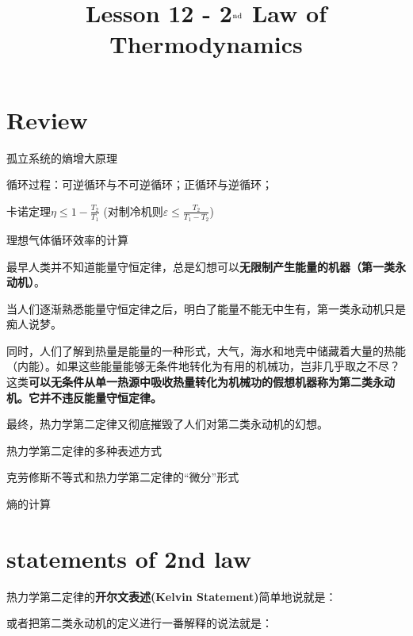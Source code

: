 \documentclass[CJK]{beamer}
\title{Lesson 12 - 2$^{\rm nd}$ Law of Thermodynamics}
\author{}
\date{}
\begin{document}

\section{Review}

\begin{frame}
\bch 
\bitem
\item{孤立系统的熵增大原理}
\item{循环过程：可逆循环与不可逆循环；正循环与逆循环；}
\item{卡诺定理$\eta \le 1 -\frac{T_2}{T_1}$ (对制冷机则$\varepsilon \le \frac{T_2}{T_1-T_2}$)}
\item{理想气体循环效率的计算}
\eitem
\ech
\end{frame}

\begin{frame}
\bch
\bitem
\item{最早人类并不知道能量守恒定律，总是幻想可以{\bf 无限制产生能量的机器（第一类永动机）}。}
\item{当人们逐渐熟悉能量守恒定律之后，明白了能量不能无中生有，第一类永动机只是痴人说梦。}
\item{同时，人们了解到热量是能量的一种形式，大气，海水和地壳中储藏着大量的热能（内能）。如果这些能量能够无条件地转化为有用的机械功，岂非几乎取之不尽？这类{\bf 可以无条件从单一热源中吸收热量转化为机械功的假想机器称为第二类永动机。它并不违反能量守恒定律。}}
\item{最终，热力学第二定律又彻底摧毁了人们对第二类永动机的幻想。}
\eitem
\ech
\end{frame}

\begin{frame}
\bch
\bitem
\item{热力学第二定律的多种表述方式}
\item{克劳修斯不等式和热力学第二定律的“微分”形式}
\item{熵的计算}
\eitem
\ech
\end{frame}

\section{statements of 2nd law}


\begin{frame}
\bch
热力学第二定律的{\bf 开尔文表述(Kelvin Statement)}简单地说就是：

或者把第二类永动机的定义进行一番解释的说法就是：
\ech
\end{frame}
\end{document}
